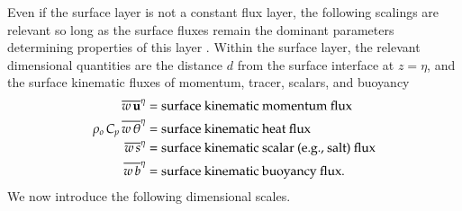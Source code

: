 Even if the surface layer is not a constant flux layer, the following
scalings are relevant so long as the surface fluxes remain the
dominant parameters determining properties of this layer
\citep{Tennekes1973}.  Within the surface layer, the relevant
dimensional quantities are the distance $d$ from the surface interface
at $z=\eta$, and the surface kinematic fluxes of momentum, tracer,
scalars, and buoyancy
\begin{align}
  \overline{w \, {\bf u}}^{\eta} &= \mbox{surface kinematic momentum flux}
\\
 \rho_{o} \, C_{p} \, \overline{w \, \theta}^{\eta} &= \mbox{surface kinematic heat flux}
\\
 \overline{w \, s}^{\eta} &= \mbox{surface kinematic scalar (e.g., salt) flux}
\\
 \overline{w \, b}^{\eta} &= \mbox{surface kinematic buoyancy flux.}
\end{align} 
 We now introduce the following dimensional scales.
